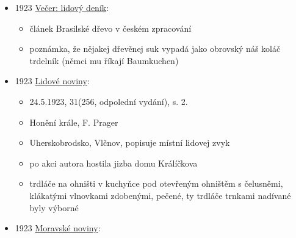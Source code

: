 \begin{itemize}
\begin{itemize}
\begin{itemize}
      \begin{itemize}
      \tightlist
      \item
        14. trdelníky, chystají se do kúta, na křtiny, úvodky i svatby,
        na valadle se naválí dlouhé těsto jako provázky, natočí na horké
        dřevěné trdlo, pomastí vejcem, posype tlučenými ořechy, potom se
        to dá na dřevěné koze nad ohniště pod otevřeným komínem a pomalu
        se tím otáčí a peče
      \end{itemize}
    \item
      co smažíme: recept na smaženej trdelník z těsta ze smetany, mouky
      a vajec, plástek těsta se namotá na váleček a obtočí se šňůrkou a
      ponoří do vroucího sádla, po osmažení se posype skořicí a cukrem
    \end{itemize}
  \item
    s. 533: zabijačka, k večeři se dělá obarovice, drobky s máčkou
    kyselou, jitrnice se zelím, potom trdelníky nebo koblihy
  \end{itemize}
\item
  1923
  \href{https://ceskadigitalniknihovna.cz/uuid/uuid:6ef4c460-b7b1-11e9-8f08-5ef3fc9ae867}{Večer:
  lidový deník}:

  \begin{itemize}
  \tightlist
  \item
    článek Brasilské dřevo v českém zpracování
  \item
    poznámka, že nějakej dřevěnej suk vypadá jako obrovský náš koláč
    trdelník (němci mu říkají Baumkuchen)
  \end{itemize}
\item
  1923
  \href{https://ndk.cz/uuid/uuid:943751b0-8619-11dc-9580-000d606f5dc6}{Lidové
  noviny}:

  \begin{itemize}
  \tightlist
  \item
    24.5.1923, 31(256, odpolední vydání), s. 2.
  \item
    Honění krále, F. Prager
  \item
    Uherskobrodsko, Vlčnov, popisuje místní lidovej zvyk
  \item
    po akci autora hostila jizba domu Králíčkova
  \item
    trdláče na ohništi v kuchyňce pod otevřeným ohništěm s čelusněmi,
    klákatými vlnovkami zdobenými, pečené, ty trdláče trnkami nadívané
    byly výborné
  \end{itemize}
\item
  1923
  \href{https://www.digitalniknihovna.cz/vkol/uuid/uuid:b5acbdfb-90cb-4e71-942b-33eb034cb607}{Moravské
  noviny}:


\end{itemize}
